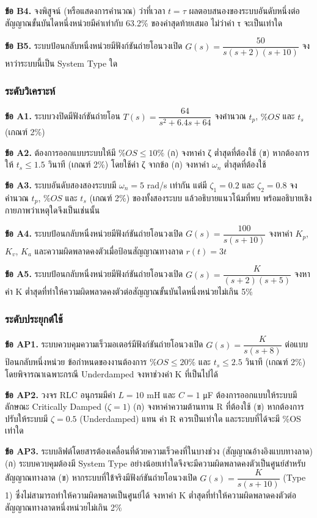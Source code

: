 \textbf{ข้อ B4.} จงพิสูจน์ (หรือแสดงการคำนวณ) ว่าที่เวลา $t=\tau$ ผลตอบสนองของระบบอันดับหนึ่งต่อสัญญาณขั้นบันไดหนึ่งหน่วยมีค่าเท่ากับ 63.2\% ของค่าสุดท้ายเสมอ ไม่ว่าค่า τ จะเป็นเท่าใด

\textbf{ข้อ B5.} ระบบป้อนกลับหนึ่งหน่วยมีฟังก์ชันถ่ายโอนวงเปิด $G(s)=\dfrac{50}{s(s+2)(s+10)}$ จงหาว่าระบบนี้เป็น System Type ใด

\subsubsection{ระดับวิเคราะห์}

\textbf{ข้อ A1.} ระบบวงปิดมีฟังก์ชันถ่ายโอน $T(s)=\dfrac{64}{s^2+6.4s+64}$ จงคำนวณ $t_p$, $\%OS$ และ $t_s$ (เกณฑ์ 2\%)

\textbf{ข้อ A2.} ต้องการออกแบบระบบให้มี $\%OS \le 10\%$ (ก) จงหาค่า ζ ต่ำสุดที่ต้องใช้ (ข) หากต้องการให้ $t_s \le 1.5$ วินาที (เกณฑ์ 2\%) โดยใช้ค่า ζ จากข้อ (ก) จงหาค่า $\omega_n$ ต่ำสุดที่ต้องใช้

\textbf{ข้อ A3.} ระบบอันดับสองสองระบบมี $\omega_n=5$ rad/s เท่ากัน แต่มี $\zeta_1=0.2$ และ $\zeta_2=0.8$ จงคำนวณ $t_p$, $\%OS$ และ $t_s$ (เกณฑ์ 2\%) ของทั้งสองระบบ แล้วอธิบายแนวโน้มที่พบ พร้อมอธิบายเชิงกายภาพว่าเหตุใดจึงเป็นเช่นนั้น

\textbf{ข้อ A4.} ระบบป้อนกลับหนึ่งหน่วยมีฟังก์ชันถ่ายโอนวงเปิด $G(s)=\dfrac{100}{s(s+10)}$ จงหาค่า $K_p$, $K_v$, $K_a$ และความผิดพลาดคงตัวเมื่อป้อนสัญญาณทางลาด $r(t)=3t$

\textbf{ข้อ A5.} ระบบป้อนกลับหนึ่งหน่วยมีฟังก์ชันถ่ายโอนวงเปิด $G(s)=\dfrac{K}{(s+2)(s+5)}$ จงหาค่า K ต่ำสุดที่ทำให้ความผิดพลาดคงตัวต่อสัญญาณขั้นบันไดหนึ่งหน่วยไม่เกิน 5\%

\subsubsection{ระดับประยุกต์ใช้}

\textbf{ข้อ AP1.} ระบบควบคุมความเร็วมอเตอร์มีฟังก์ชันถ่ายโอนวงเปิด $G(s)=\dfrac{K}{s(s+8)}$ ต่อแบบป้อนกลับหนึ่งหน่วย ข้อกำหนดของงานต้องการ $\%OS \le 20\%$ และ $t_s \le 2.5$ วินาที (เกณฑ์ 2\%) โดยพิจารณาเฉพาะกรณี Underdamped จงหาช่วงค่า K ที่เป็นไปได้

\textbf{ข้อ AP2.} วงจร RLC อนุกรมมีค่า $L=10$ mH และ $C=1$ μF ต้องการออกแบบให้ระบบมีลักษณะ Critically Damped ($\zeta=1$) (ก) จงหาค่าความต้านทาน R ที่ต้องใช้ (ข) หากต้องการปรับให้ระบบมี $\zeta=0.5$ (Underdamped) แทน ค่า R ควรเป็นเท่าใด และระบบที่ได้จะมี \%OS เท่าใด

\textbf{ข้อ AP3.} ระบบลิฟต์โดยสารต้องเคลื่อนที่ด้วยความเร็วคงที่ในบางช่วง (สัญญาณอ้างอิงแบบทางลาด) (ก) ระบบควบคุมต้องมี System Type อย่างน้อยเท่าใดจึงจะมีความผิดพลาดคงตัวเป็นศูนย์สำหรับสัญญาณทางลาด (ข) หากระบบที่ใช้จริงมีฟังก์ชันถ่ายโอนวงเปิด $G(s)=\dfrac{K}{s(s+10)}$ (Type 1) ซึ่งไม่สามารถทำให้ความผิดพลาดเป็นศูนย์ได้ จงหาค่า K ต่ำสุดที่ทำให้ความผิดพลาดคงตัวต่อสัญญาณทางลาดหนึ่งหน่วยไม่เกิน 2\%

